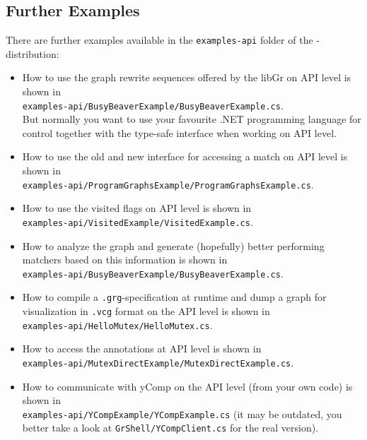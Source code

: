 \subsection*{Further Examples}
There are further examples available in the \texttt{examples-api} folder of the \GrG-distribution:
\begin{itemize} 
\item How to use the graph rewrite sequences offered by the libGr on API level is shown in\\
\texttt{examples-api/BusyBeaverExample/BusyBeaverExample.cs}.\\
But normally you want to use your favourite .NET programming language for control together with the type-safe interface when working on API level.
\item How to use the old and new interface for accessing a match on API level is shown in\\
\texttt{examples-api/ProgramGraphsExample/ProgramGraphsExample.cs}.
\item How to use the visited\label{apiallocvisitflag} flags on API level is shown in\\
\texttt{examples-api/VisitedExample/VisitedExample.cs}.
\item How to analyze the graph and generate (hopefully) better performing matchers based on this information is shown in\\
\texttt{examples-api/BusyBeaverExample/BusyBeaverExample.cs}.
\item How to compile a \texttt{.grg}-specification at runtime and dump a graph for visualization in \texttt{.vcg} format on the API level is shown in\\
\texttt{examples-api/HelloMutex/HelloMutex.cs}.
\item How to access the annotations at API level is shown in\\
\texttt{examples-api/MutexDirectExample/MutexDirectExample.cs}.
\item How to communicate with yComp on the API level (from your own code) is shown in\\
\texttt{examples-api/YCompExample/YCompExample.cs} (it may be outdated, you better take a look at \texttt{GrShell/YCompClient.cs} for the real version).
\end{itemize}

